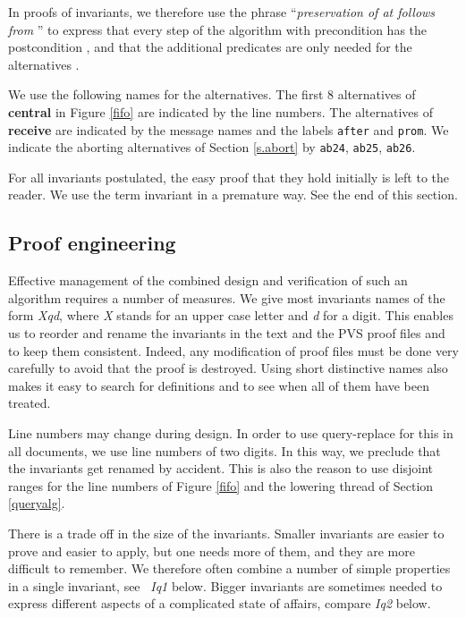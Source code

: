 \documentclass[10pt]{article} \usepackage[english]{babel}
\def\S #1/{\mbox {\textsl{#1}}}
\def\B #1/{\mbox {\textbf{#1}}}
\def\T #1/{\mbox {\texttt{#1}}}
\begin{document}
In proofs of invariants, we therefore use the phrase
``\emph{preservation of  at  follows from
  }'' to express that every step of the algorithm with
precondition  has the postcondition , and that
the additional predicates  are only needed for the
alternatives .

We use the following names for the alternatives.  The first 8
alternatives of \B central/ in Figure \ref{fifo} are indicated by the
line numbers. The alternatives of \B receive/ are indicated by the
message names and the labels \T after/ and \T prom/. We indicate the
aborting alternatives of Section \ref{s.abort} by \T ab24/, \T ab25/,
\T ab26/.

For all invariants postulated, the easy proof that they hold initially
is left to the reader. We use the term invariant in a premature
way.  See the end of this section.  

\subsection{Proof engineering} \label{peculiarity}

Effective management of the combined design and verification of such
an algorithm requires a number of measures.  We give most invariants
names of the form \S Xqd/, where \S X/ stands for an upper case letter
and \S d/ for a digit. This enables us to reorder and rename the
invariants in the text and the PVS proof files and to keep them
consistent.  Indeed, any modification of proof files must be done very
carefully to avoid that the proof is destroyed.  Using short
distinctive names also makes it easy to search for definitions and to
see when all of them have been treated.

Line numbers may change during design.  In order to use query-replace
for this in all documents, we use line numbers of two digits.  In this
way, we preclude that the invariants get renamed by accident.  This is
also the reason to use disjoint ranges for the line numbers of Figure
\ref{fifo} and the lowering thread of Section \ref{queryalg}.

There is a trade off in the size of the invariants.  Smaller
invariants are easier to prove and easier to apply, but one needs more
of them, and they are more difficult to remember.  We therefore often
combine a number of simple properties in a single invariant, see \S
Iq1/ below.  Bigger invariants are sometimes needed to express
different aspects of a complicated state of affairs, compare \S Iq2/
below.
\end{document}

